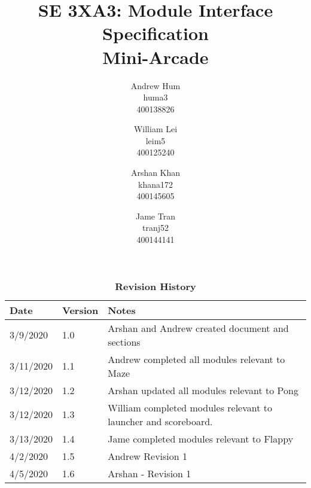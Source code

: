 \documentclass[12pt, titlepage]{article}
\title{SE 3XA3: Module Interface Specification\\Mini-Arcade}
\author{Andrew Hum \\ huma3 \\ 400138826 \and
		William Lei \\ leim5 \\ 400125240 \and
		Arshan Khan \\ khana172 \\ 400145605 \and
		Jame Tran \\ tranj52 \\ 400144141
}
\date{}
\begin{document}
\newpage

\maketitle
\maketitle
\newpage
\tableofcontents

\begin{table}[bp]
\caption{\bf Revision History}
\begin{tabularx}{\textwidth}{p{3cm}p{2cm}X}
\toprule {\bf Date} & {\bf Version} & {\bf Notes}\\
\midrule
3/9/2020 & 1.0 & Arshan and Andrew created document and sections\\
3/11/2020 & 1.1 & Andrew completed all modules relevant to Maze\\
3/12/2020 & 1.2 & Arshan updated all modules relevant to Pong\\
3/12/2020 & 1.3 & William completed modules relevant to launcher and scoreboard.\\
3/13/2020 & 1.4 & Jame completed modules relevant to Flappy\\
4/2/2020 & 1.5 & Andrew Revision 1\\
4/5/2020 & 1.6 & Arshan - Revision 1\\
\bottomrule
\end{tabularx}
\end{table}

\newpage
\end{document}
